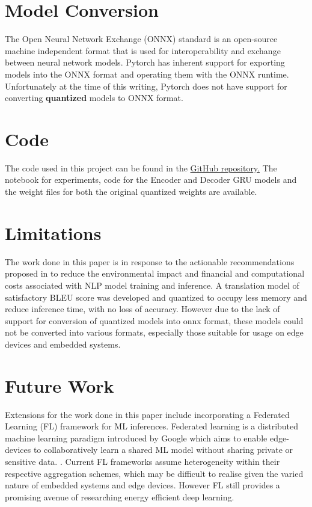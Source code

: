 \documentclass{sigchi}
\begin{document}
\section{Model Conversion}
\par 


\par The Open Neural Network Exchange (ONNX) standard is an open-source machine independent format that is used for interoperability and exchange between neural network models. \cite{compilingonnx} Pytorch has inherent support for exporting models into the ONNX format and operating them with the ONNX runtime. Unfortunately at the time of this writing, Pytorch does not have support for converting \textbf{quantized} models to ONNX format. 



\section{Code}
The code used in this project can be found in the  \href{https://github.com/dwil2444/NMT_Mobile}{GitHub repository.} The notebook for experiments, code for the Encoder and Decoder GRU models and the weight files for both the original quantized weights are available.

\section{Limitations}
\par The work done in this paper is in response to the actionable recommendations proposed in \cite{energypolicy} to reduce the environmental impact and financial and computational costs associated with NLP model training and inference. A translation model of satisfactory BLEU score was developed and quantized to occupy less memory and reduce inference time, with no loss of accuracy. However due to the lack of support for conversion of quantized models into onnx format, these models could not be converted into various formats, especially those suitable for usage on edge devices and embedded systems. 

\section{Future Work}
\par Extensions for the work done in this paper include incorporating a Federated Learning (FL) framework for ML inferences. Federated learning is a distributed machine learning paradigm introduced by Google which aims to enable edge-devices to collaboratively learn a shared ML model without sharing private or sensitive data. \cite{federated}. Current FL frameworks assume heterogeneity within their respective aggregation schemes, which may be difficult to realise given the varied nature of embedded systems and edge devices. However FL still provides a promising avenue of researching energy efficient deep learning.
\end{document}
